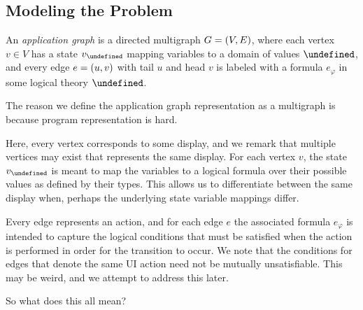 \documentclass[12pt]{article}
\let\state\undefined
\newcommand{\state}{\ensuremath{\sigma}}
\let\domval\undefined
\newcommand{\domval}{\ensuremath{\mathcal{A}}}
\newcommand{\form}{\ensuremath{\varphi}}
\let\domform\undefined
\newcommand{\domform}{\ensuremath{\mathcal{F}}}
\begin{document}
\subsection{Modeling the Problem}
\begin{definition}
An \textit{application graph} is a directed multigraph $G = {\left(V, E\right)}$,
where each vertex $v \in V$ has a state $v_{\state}$ mapping
variables to a domain of values $\domval$,
and every edge $e = {\left(u, v\right)}$ with tail $u$ and head $v$ is labeled
with a formula $e_{\form}$ in some logical theory $\domform$.
\end{definition}

The reason we define the application graph representation as a multigraph
is because program representation is hard.

Here, every vertex corresponds to some display, and we remark
that multiple vertices may exist that represents the same display.
For each vertex $v$, the state $v_{\state}$ is meant to map the variables
to a logical formula over their possible values as defined by their types.
This allows us to differentiate between the same display when, perhaps
the underlying state variable mappings differ.

Every edge represents an action, and for each edge $e$
the associated formula $e_{\form}$ is intended to capture the logical
conditions that must be satisfied when the action is performed in order
for the transition to occur.
We note that the conditions for edges that denote the same UI action
need not be mutually unsatisfiable.
This may be weird, and we attempt to address this later.

So what does this all mean?
\end{document}
